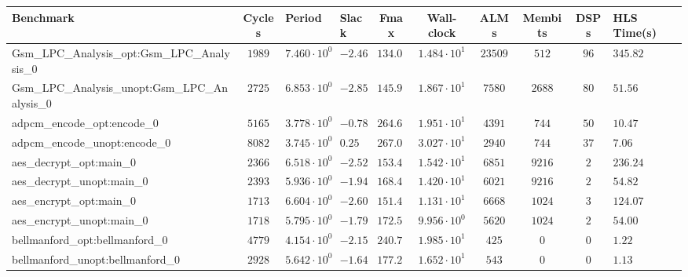 \begin{tabular}{|l|c|HHc|c|c|c|cH|}
\hline
Benchmark                                       & Cycles       & Period                 & Slack     & Fmax       & Wall-clock              & ALMs       & Membits     & DSPs    & HLS Time(s) \\
\hline
Gsm\_LPC\_Analysis\_opt:Gsm\_LPC\_Analysis\_0   & $ 1989     $ & $ 7.460 \cdot 10^{0} $ & $ -2.46 $ & $ 134.05 $ & $ 1.484 \cdot 10^{1}  $ & $ 23509  $ & $ 512     $ & $ 96  $ & $ 345.82  $ \\
Gsm\_LPC\_Analysis\_unopt:Gsm\_LPC\_Analysis\_0 & $ 2725     $ & $ 6.853 \cdot 10^{0} $ & $ -2.85 $ & $ 145.92 $ & $ 1.867 \cdot 10^{1}  $ & $ 7580   $ & $ 2688    $ & $ 80  $ & $ 51.56   $ \\
adpcm\_encode\_opt:encode\_0                    & $ 5165     $ & $ 3.778 \cdot 10^{0} $ & $ -0.78 $ & $ 264.69 $ & $ 1.951 \cdot 10^{1}  $ & $ 4391   $ & $ 744     $ & $ 50  $ & $ 10.47   $ \\
adpcm\_encode\_unopt:encode\_0                  & $ 8082     $ & $ 3.745 \cdot 10^{0} $ & $ 0.25  $ & $ 267.02 $ & $ 3.027 \cdot 10^{1}  $ & $ 2940   $ & $ 744     $ & $ 37  $ & $ 7.06    $ \\
aes\_decrypt\_opt:main\_0                       & $ 2366     $ & $ 6.518 \cdot 10^{0} $ & $ -2.52 $ & $ 153.42 $ & $ 1.542 \cdot 10^{1}  $ & $ 6851   $ & $ 9216    $ & $ 2   $ & $ 236.24  $ \\
aes\_decrypt\_unopt:main\_0                     & $ 2393     $ & $ 5.936 \cdot 10^{0} $ & $ -1.94 $ & $ 168.46 $ & $ 1.420 \cdot 10^{1}  $ & $ 6021   $ & $ 9216    $ & $ 2   $ & $ 54.82   $ \\
aes\_encrypt\_opt:main\_0                       & $ 1713     $ & $ 6.604 \cdot 10^{0} $ & $ -2.60 $ & $ 151.42 $ & $ 1.131 \cdot 10^{1}  $ & $ 6668   $ & $ 1024    $ & $ 3   $ & $ 124.07  $ \\
aes\_encrypt\_unopt:main\_0                     & $ 1718     $ & $ 5.795 \cdot 10^{0} $ & $ -1.79 $ & $ 172.56 $ & $ 9.956 \cdot 10^{0}  $ & $ 5620   $ & $ 1024    $ & $ 2   $ & $ 54.00   $ \\
bellmanford\_opt:bellmanford\_0                 & $ 4779     $ & $ 4.154 \cdot 10^{0} $ & $ -2.15 $ & $ 240.73 $ & $ 1.985 \cdot 10^{1}  $ & $ 425    $ & $ 0       $ & $ 0   $ & $ 1.22    $ \\
bellmanford\_unopt:bellmanford\_0               & $ 2928     $ & $ 5.642 \cdot 10^{0} $ & $ -1.64 $ & $ 177.24 $ & $ 1.652 \cdot 10^{1}  $ & $ 543    $ & $ 0       $ & $ 0   $ & $ 1.13    $ \\

\end{tabular}

